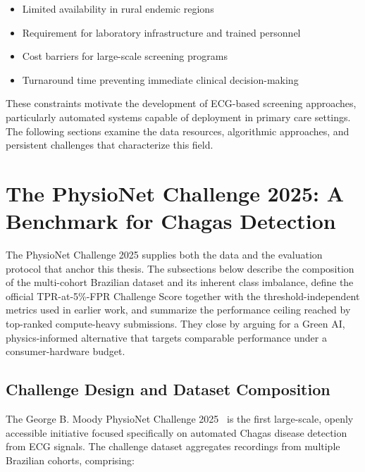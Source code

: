 \begin{itemize}
    \item Limited availability in rural endemic regions
    \item Requirement for laboratory infrastructure and trained personnel
    \item Cost barriers for large-scale screening programs
    \item Turnaround time preventing immediate clinical decision-making
\end{itemize}

These constraints motivate the development of ECG-based screening approaches, particularly automated systems capable of deployment in primary care settings. The following sections examine the data resources, algorithmic approaches, and persistent challenges that characterize this field.

\section{The PhysioNet Challenge 2025: A Benchmark for Chagas Detection}

The PhysioNet Challenge 2025 supplies both the data and the evaluation protocol that anchor this thesis. The subsections below describe the composition of the multi-cohort Brazilian dataset and its inherent class imbalance, define the official TPR-at-5\%-FPR Challenge Score together with the threshold-independent metrics used in earlier work, and summarize the performance ceiling reached by top-ranked compute-heavy submissions. They close by arguing for a Green AI, physics-informed alternative that targets comparable performance under a consumer-hardware budget.

\subsection{Challenge Design and Dataset Composition}

The George B. Moody PhysioNet Challenge 2025~\cite{reyna2024detection} is the first large-scale, openly accessible initiative focused specifically on automated Chagas disease detection from ECG signals. The challenge dataset aggregates recordings from multiple Brazilian cohorts, comprising:

